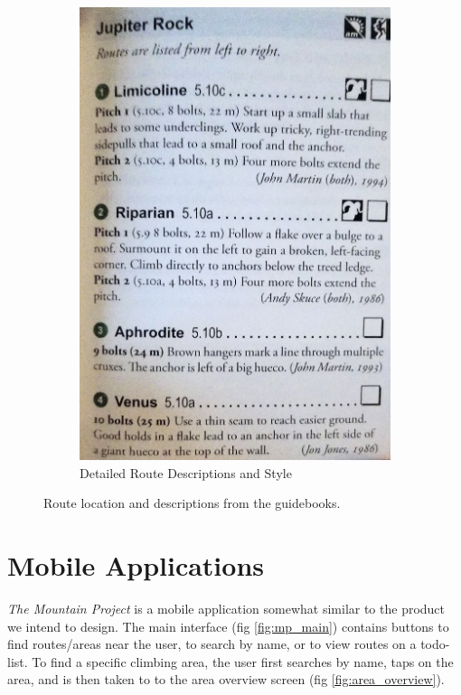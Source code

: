 \documentclass[10pt]{article}
\begin{document}
\begin{figure}[!htb]
\begin{subfigure}[b]{0.3\textwidth}
    \includegraphics[width=\textwidth]{jupiter_rock_descriptions.jpg}
    \caption{Detailed Route Descriptions and Style}
    \label{fig:route_descriptions}
  \end{subfigure}
  \caption{Route location and descriptions from the guidebooks.}
\end{figure}

\section{Mobile Applications}

\emph{The Mountain Project} is a mobile application somewhat similar to the product we intend to design. The main interface (fig \ref{fig:mp_main}) contains buttons to find routes/areas near the user, to search by name, or to view routes on a todo-list. To find a specific climbing area, the user first searches by name, taps on the area, and is then taken to to the area overview screen (fig \ref{fig:area_overview}).
\end{document}
